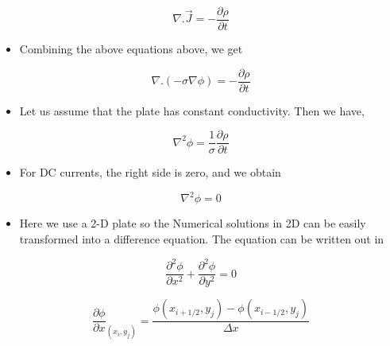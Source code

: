 \documentclass{article}
\begin{document}
    \begin{equation}
    \nabla.\vec{J} = -\frac{\partial \rho}{\partial t}
       \end{equation}
    
    \begin{itemize}
    \item
      Combining the above equations above, we get
    \end{itemize}
    
    \begin{equation}
    \nabla.(-\sigma\nabla\phi) = -\frac{\partial \rho}{\partial t}
       \end{equation}
    
    \begin{itemize}
    \item
      Let us assume that the plate has constant conductivity. Then we have,

    \end{itemize}
    
    \begin{equation}
    \nabla^{2}\phi = \frac{1}{\sigma}\frac{\partial \rho}{\partial t}
       \end{equation}
    
    \begin{itemize}
    \item
      For DC currents, the right side is zero, and we obtain
    \end{itemize}
    
    \begin{equation}
    \nabla^{2}\phi = 0
       \end{equation}
    
    \begin{itemize}
    \item
      Here we use a 2-D plate so the Numerical solutions in 2D can be easily
      transformed into a difference equation. The equation can be written
      out in
    \end{itemize}
    
    \begin{equation}
    \frac{\partial^{2} \phi}{\partial x^{2}}+ \frac{\partial^{2} \phi}{\partial y^{2}} = 0
     \end{equation}
    
    \begin{equation}
    \frac{\partial \phi}{\partial x}_{(x_i,y_j)} = \frac{\phi(x_{i+1/2},y_j) - \phi(x_{i-1/2},y_j)}{\Delta x}
     \end{equation}
    
\end{document}
